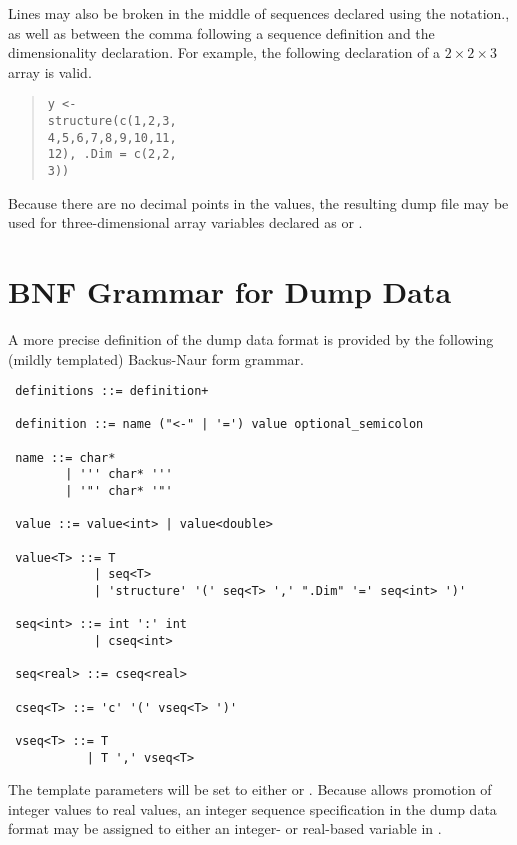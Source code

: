 Lines may also be broken in the middle of sequences declared
using the  notation., as well as between the comma
following a sequence definition and the dimensionality declaration.
For example, the following declaration of a $2 \times 2 \times 3$
array is valid.
%
\begin{quote}
\begin{Verbatim}[fontsize=\small]
y <-
structure(c(1,2,3,
4,5,6,7,8,9,10,11,
12), .Dim = c(2,2,
3))
\end{Verbatim}
\end{quote}
%
Because there are no decimal points in the values, the resulting dump
file may be used for three-dimensional array variables declared as
 or .

\section{BNF Grammar for Dump Data}

A more precise definition of the dump data format is provided
by the following (mildly templated) Backus-Naur form grammar.

{\small 
\begin{verbatim}
 definitions ::= definition+

 definition ::= name ("<-" | '=') value optional_semicolon

 name ::= char* 
        | ''' char* ''' 
        | '"' char* '"'

 value ::= value<int> | value<double>

 value<T> ::= T 
            | seq<T>
            | 'structure' '(' seq<T> ',' ".Dim" '=' seq<int> ')'

 seq<int> ::= int ':' int
            | cseq<int>

 seq<real> ::= cseq<real>

 cseq<T> ::= 'c' '(' vseq<T> ')'

 vseq<T> ::= T
           | T ',' vseq<T>
\end{verbatim}
}
\noindent
The template parameters  will be set to either  or
.  Because \Stan allows promotion of integer values to real
values, an integer sequence specification in the dump data format may
be assigned to either an integer- or real-based variable in \Stan.










